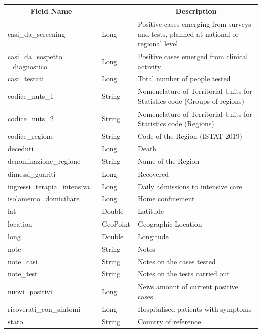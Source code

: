 \documentclass[a4paper,12pt]{article}
\begin{document}
\paragraph{}
\begin{center}
\begin{tabular}{|m{45mm}|>{\raggedright}m{16mm}|m{75mm}|}
\hline
\multicolumn{1}{|c|}{\textbf{ Field Name }}
& \multicolumn{1}{c|}{\textbf{ Data Type }} 
    	& \multicolumn{1}{c|}{\textbf{ Description }}\\
\hline
casi\_da\_screening & Long & Positive cases emerging from surveys and tests, planned at national or regional level \\
\hline
casi\_da\_sospetto \_diagnostico & Long & Positive cases emerged from clinical activity \\
\hline
casi\_testati & Long & Total number of people tested \\
\hline
codice\_nuts\_1 & String & Nomenclature of Territorial Units for Statistics code (Groups of regions) \\
\hline
codice\_nuts\_2 & String & Nomenclature of Territorial Units for Statistics code (Regions) \\
\hline
codice\_regione & String & Code of the Region (ISTAT 2019) \\
\hline
deceduti & Long & Death \\
\hline
denominazione\_regione & String & Name of the Region \\
\hline
dimessi\_guariti & Long & Recovered \\
\hline
ingressi\_terapia\_intensiva & Long & Daily admissions to intensive care \\
\hline
isolamento\_domiciliare & Long & Home confinement \\
\hline
lat & Double & Latitude \\
\hline
location & GeoPoint & Geographic Location \\
\hline
long & Double & Longitude \\
\hline
note & String & Notes \\
\hline
note\_casi & String & Notes on the cases tested \\
\hline
note\_test & String & Notes on the tests carried out \\
\hline
nuovi\_positivi & Long & News amount of current positive cases \\
\hline
ricoverati\_con\_sintomi & Long & Hospitalised patients with symptoms \\
\hline
stato & String & Country of reference \\

\end{tabular}
\end{center}
\end{document}
